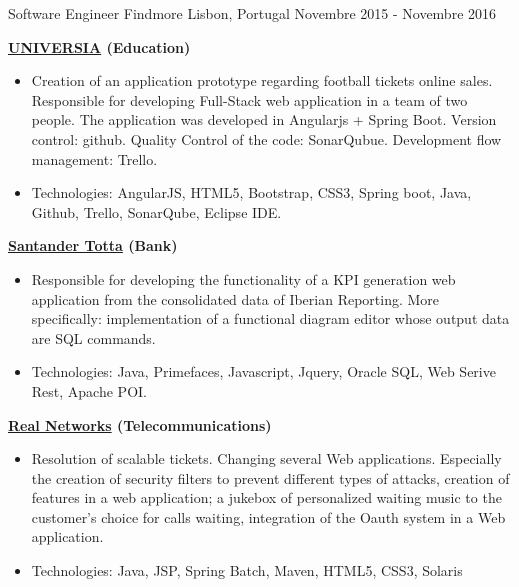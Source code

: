 \begin{cventries}
\cventry
{Software Engineer} %
{Findmore} %
{Lisbon, Portugal} %
{Novembre 2015 - Novembre 2016} %
{ %
\begin{cvitems}
\item { \textbf{\href{http://www.universia.pt/}{UNIVERSIA} (Education)}}
\begin{itemize}
\item {Creation of an application  prototype  regarding  football tickets  online sales.
Responsible for developing Full-Stack web application in a team of two people. The application was developed in Angularjs + Spring Boot. Version control: github. Quality Control of the code: SonarQubue. Development flow management: Trello.
}
\item {Technologies: AngularJS, HTML5, Bootstrap, CSS3, Spring boot, Java, Github, Trello, SonarQube, Eclipse IDE.}
\end{itemize}
\item { \textbf{\href{https://www.santandertotta.pt/pt_PT/Particulares.html}{Santander Totta} (Bank)}}
\begin{itemize}
\item {Responsible for developing the functionality of a KPI generation web application from the consolidated data of Iberian Reporting. More specifically: implementation of a functional diagram editor whose output data are SQL commands.}
\item {Technologies: Java, Primefaces, Javascript, Jquery, Oracle SQL, Web Serive Rest, Apache POI.}
\end{itemize}
\item { \textbf{\href{https://www.realnetworks.com/}{Real Networks} (Telecommunications)}}
\begin{itemize}
\item {Resolution of scalable tickets. Changing several Web applications. Especially the creation of security filters to prevent different types of attacks, creation of features in a web application; a jukebox of personalized waiting music to the customer's choice for calls waiting, integration of the Oauth system in a Web application.}
\item {Technologies: Java, JSP, Spring Batch, Maven, HTML5, CSS3,  Solaris}
\end{itemize}
\end{cvitems}
}



\end{cventries}

